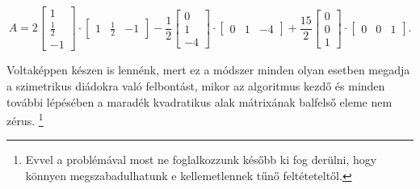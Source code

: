 \documentclass[a4paper, showtrims]{memoir}
\theoremstyle{plain}
\theoremstyle{remark}
\theoremstyle{definition}
\begin{document}
    \[
        A
        =
        2
        \begin{bmatrix}
        1\\ \frac{1}{2}\\ -1
        \end{bmatrix}
        \cdot
        \begin{bmatrix}
        1& \frac{1}{2}& -1
        \end{bmatrix}
        -\frac{1}{2}
        \begin{bmatrix}
            0\\1\\-4
        \end{bmatrix}
        \cdot
        \begin{bmatrix}
            0&1&-4
        \end{bmatrix}
        +
        \frac{15}{2}
        \begin{bmatrix}
            0\\0\\1
        \end{bmatrix}
        \cdot
        \begin{bmatrix}
            0&0&1
        \end{bmatrix}.
    \]

Voltaképpen készen is lennénk, mert
ez a módszer minden olyan esetben megadja a szimetrikus diádokra való felbontást,
mikor az algoritmus kezdő és minden további lépésében a maradék kvadratikus alak mátrixának balfelső eleme nem zérus.%
\footnote{
Evvel a problémával most ne foglalkozzunk később ki fog derülni, 
hogy könnyen megszabadulhatunk e kellemetlennek tűnő feltéteteltől.}
\end{document}
